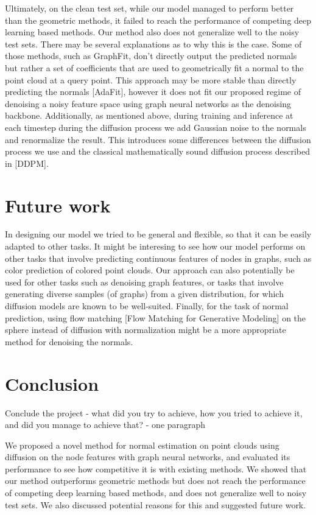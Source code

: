 \documentclass{acmart}
\begin{document}
Ultimately, on the clean test set, while our model managed to perform better than the geometric methods, it failed to reach the performance of competing deep learning based methods. Our method also does not generalize well to the noisy test sets. There may be several explanations as to why this is the case. Some of those methods, such as GraphFit, don't directly output the predicted normals but rather a set of coefficients that are used to geometrically fit a normal to the point cloud at a query point. This approach may be more stable than directly predicting the normals [AdaFit], however it does not fit our proposed regime of denoising a noisy feature space using graph neural networks as the denoising backbone. Additionally, as mentioned above, during training and inference at each timestep during the diffusion process we add Gaussian noise to the normals and renormalize the result. This introduces some differences between the diffusion process we use and the classical mathematically sound diffusion process described in [DDPM].


\section{Future work}
In designing our model we tried to be general and flexible, so that it can be easily adapted to other tasks. It might be interesing to see how our model performs on other tasks that involve predicting continuous features of nodes in graphs, such as color prediction of colored point clouds. Our approach can also potentially be used for other tasks such as denoising graph features, or tasks that involve generating diverse samples (of graphs) from a given distribution, for which diffusion models are known to be well-suited.
Finally, for the task of normal prediction, using flow matching [Flow Matching for Generative Modeling] on the sphere instead of diffusion with normalization might be a more appropriate method for denoising the normals.

\section{Conclusion}
Conclude the project - what did you try to achieve, how you tried to achieve it, and did you manage to achieve that?  - one paragraph

We proposed a novel method for normal estimation on point clouds using diffusion on the node features with graph neural networks, and evaluated its performance to see how competitive it is with existing methods. We showed that our method outperforms geometric methods but does not reach the performance of competing deep learning based methods, and does not generalize well to noisy test sets. We also discussed potential reasons for this and suggested future work.



\end{document}
